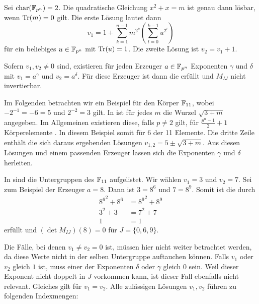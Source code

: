\begin{lemma}
    Sei $\charac(\field{p}[n]) = 2$. Die quadratische Gleichung $x^2 + x = m$ ist genau dann lösbar, wenn $\mathrm{Tr}(m) = 0$ gilt. Die erste Lösung lautet dann
    \begin{equation*}
        v_1 = 1 + \sum_{k=1}^{n-1} m^{2^k}(\sum_{l=0}^{k-1} u^{2^l})
    \end{equation*}
     für ein beliebiges $u \in \field{p}[n]$ mit $\mathrm{Tr}(u) = 1$. Die zweite Lösung ist $v_2 = v_1 + 1$.
\end{lemma}

Sofern $v_1,v_2 \neq 0$ sind, existieren für jeden Erzeuger $a \in \field{p}[n]$ Exponenten $\gamma$ und $\delta$ mit $v_1 = a^\gamma$ und $v_2 = a^\delta$. Für diese Erzeuger ist dann die  erfüllt und $M_{IJ}$ nicht invertierbar. 

Im Folgenden betrachten wir ein Beispiel für den Körper $\field{11}$, wobei $-2^{-1} = -6 = 5$ und $2^{-2} = 3$ gilt. In  ist für jedes $m$ die Wurzel $\sqrt{3 + m}$ angegeben. Im Allgemeinen existieren diese, falls $p \neq 2$ gilt, für $\frac{p^n-1}{2} + 1$ Körperelemente \cite{RootsFiniteFields}. In diesem Beispiel somit für 6 der 11 Elemente. Die dritte Zeile enthält die sich daraus ergebenden Lösungen $v_{1,2} = 5 \pm \sqrt{3+m}$. Aus diesen Lösungen und einem passenden Erzeuger lassen sich die Exponenten $\gamma$ und $\delta$ herleiten.

In  sind die Untergruppen des $\field{11}$ aufgelistet. Wir wählen $v_1 = 3$ und $v_2 = 7$. Sei zum Beispiel der Erzeuger $a = 8$. Dann ist $3 = 8^6$ und $7 = 8^9$. Somit ist die  durch
\begin{align*}
    {8^6}^2 + 8^6 &= {8^{9}}^2 + 8^9 \\
    3^2 + 3 &= 7^2 + 7 \\
    1 &= 1
\end{align*}
erfüllt und $(\det M_{IJ})(8) = 0$ für $J = \{0,6,9\}$. 

Die Fälle, bei denen $v_1 \neq v_2 = 0$ ist, müssen hier nicht weiter betrachtet werden, da diese Werte nicht in der selben Untergruppe auftauchen können. Falls $v_1$ oder $v_2$ gleich $1$ ist, muss einer der Exponenten $\delta$ oder $\gamma$ gleich $0$ sein. Weil dieser Exponent nicht doppelt in $J$ vorkommen kann, ist dieser Fall ebenfalls nicht relevant. Gleiches gilt für $v_1 = v_2$. Alle zulässigen Lösungen $v_1,v_2$ führen zu folgenden Indexmengen:

